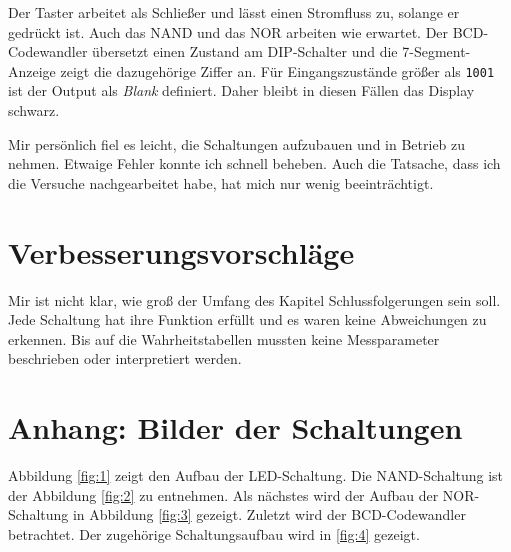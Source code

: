 \documentclass[
    paper=a4,
]{scrartcl}
\newcommand{\quoteenv}[1]{\glqq #1\grqq}
\begin{document}
    Der Taster arbeitet als Schließer und lässt einen Stromfluss zu, solange er gedrückt ist. Auch das NAND und das NOR arbeiten wie erwartet. Der BCD-Codewandler übersetzt einen Zustand am DIP-Schalter und die 7-Segment-Anzeige zeigt die dazugehörige Ziffer an. Für Eingangszustände größer als \texttt{1001} ist der Output als \textit{Blank} definiert. Daher bleibt in diesen Fällen das Display schwarz.

    Mir persönlich fiel es leicht, die Schaltungen aufzubauen und in Betrieb zu nehmen. Etwaige Fehler konnte ich schnell beheben. Auch die Tatsache, dass ich die Versuche nachgearbeitet habe, hat mich nur wenig beeinträchtigt.

\section{Verbesserungsvorschläge}


    Mir ist nicht klar, wie groß der Umfang des Kapitel \quoteenv{Schlussfolgerungen} sein soll. Jede Schaltung hat ihre Funktion erfüllt und es waren keine Abweichungen zu erkennen. Bis auf die Wahrheitstabellen mussten keine Messparameter beschrieben oder interpretiert werden.

\printbibliography[heading=bibintoc]

\appendix

\section{Anhang: Bilder der Schaltungen}
    \label{app:1}

    Abbildung \ref{fig:1} zeigt den Aufbau der LED-Schaltung. Die NAND-Schaltung ist der Abbildung \ref{fig:2} zu entnehmen. Als nächstes wird der Aufbau der NOR-Schaltung in Abbildung \ref{fig:3} gezeigt. Zuletzt wird der BCD-Codewandler betrachtet. Der zugehörige Schaltungsaufbau wird in \ref{fig:4} gezeigt.
\end{document}
